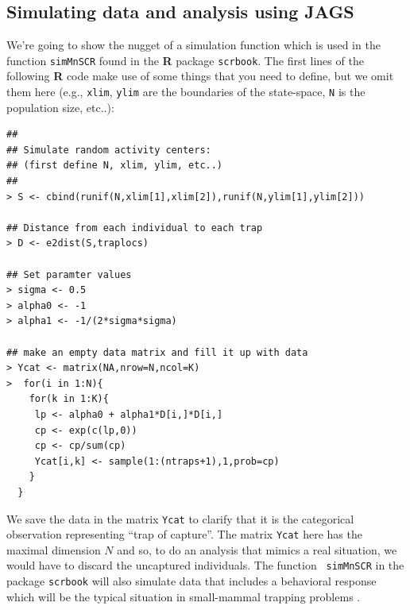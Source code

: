 \subsection{Simulating data and analysis using JAGS}

We're going to show the nugget of a simulation function which is
used in the function \mbox{\tt simMnSCR} found in the {\bf R} package
\mbox{\tt scrbook}.  The first lines of the following {\bf R} code
make use of some things that you need to define, but we omit them here
(e.g., \mbox{\tt xlim}, \mbox{\tt ylim} are the boundaries of the
state-space, \mbox{\tt N} is the population size, etc..):
{\small
\begin{verbatim}
##
## Simulate random activity centers:
## (first define N, xlim, ylim, etc..)
##
> S <- cbind(runif(N,xlim[1],xlim[2]),runif(N,ylim[1],ylim[2]))

## Distance from each individual to each trap
> D <- e2dist(S,traplocs)

## Set paramter values
> sigma <- 0.5
> alpha0 <- -1
> alpha1 <- -1/(2*sigma*sigma)

## make an empty data matrix and fill it up with data
> Ycat <- matrix(NA,nrow=N,ncol=K)
>  for(i in 1:N){
    for(k in 1:K){
     lp <- alpha0 + alpha1*D[i,]*D[i,]
     cp <- exp(c(lp,0))
     cp <- cp/sum(cp)
     Ycat[i,k] <- sample(1:(ntraps+1),1,prob=cp)
    }
  }
\end{verbatim}
}
We save the data in the matrix \mbox{\tt Ycat} to clarify that it is
the categorical observation representing ``trap of capture''. 
The matrix \mbox{\tt Ycat} here  has the maximal dimension $N$
and so, to do an  analysis that  mimics a real situation, we would have to
discard the uncaptured individuals.  The function \mbox{\tt
  simMnSCR} in the package \mbox{\tt scrbook} will also simulate
data that includes a behavioral response
 which will be the
typical situation in small-mammal trapping problems
\citep[see][for details]{converse_royle:2012}.

